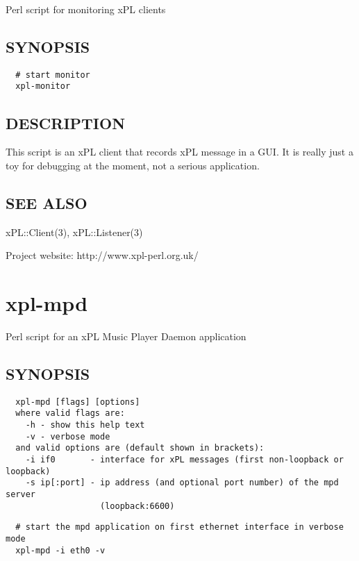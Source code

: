 \documentclass[12pt,a4paper]{article}
\begin{document}
Perl script for monitoring xPL clients

\subsection*{SYNOPSIS\label{xpl-monitor_SYNOPSIS}}
\begin{verbatim}
  # start monitor
  xpl-monitor
\end{verbatim}
\subsection*{DESCRIPTION\label{xpl-monitor_DESCRIPTION}}


This script is an xPL client that records xPL message in a GUI.  It is
really just a toy for debugging at the moment, not a serious
application.

\subsection*{SEE ALSO\label{xpl-monitor_SEE_ALSO}}


xPL::Client(3), xPL::Listener(3)



Project website: http://www.xpl-perl.org.uk/

\newpage
\section{xpl-mpd\label{xpl-mpd}}


Perl script for an xPL Music Player Daemon application

\subsection*{SYNOPSIS\label{xpl-mpd_SYNOPSIS}}
\begin{verbatim}
  xpl-mpd [flags] [options]
  where valid flags are:
    -h - show this help text
    -v - verbose mode
  and valid options are (default shown in brackets):
    -i if0       - interface for xPL messages (first non-loopback or loopback)
    -s ip[:port] - ip address (and optional port number) of the mpd server
                   (loopback:6600)
\end{verbatim}
\begin{verbatim}
  # start the mpd application on first ethernet interface in verbose mode
  xpl-mpd -i eth0 -v
\end{verbatim}
\end{document}
